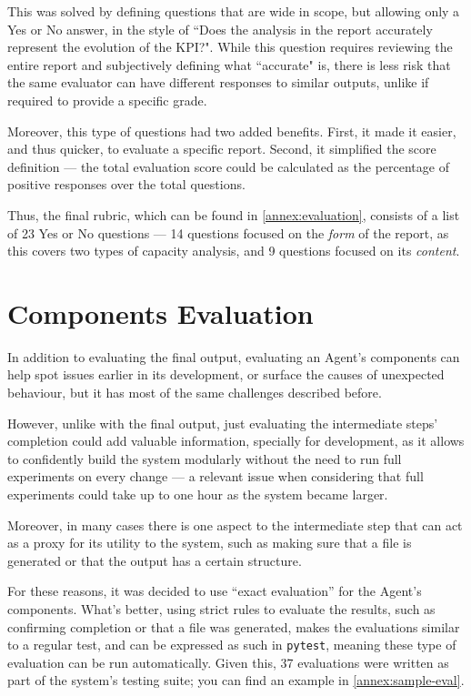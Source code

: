 \documentclass[a4paper]{report}
\begin{document}
This was solved by defining questions that are wide in scope, but allowing only a Yes or No answer, in the style of ``Does the analysis in the report accurately represent the evolution of the KPI?". While this question requires reviewing the entire report and subjectively defining what ``accurate" is, there is less risk that the same evaluator can have different responses to similar outputs, unlike if required to provide a specific grade.

Moreover, this type of questions had two added benefits. First, it made it easier, and thus quicker, to evaluate a specific report. Second, it simplified the score definition --- the total evaluation score could be calculated as the percentage of positive responses over the total questions.

Thus, the final rubric, which can be found in \autoref{annex:evaluation}, consists of a list of 23 Yes or No questions --- 14 questions focused on the \textit{form} of the report, as this covers two types of capacity analysis, and 9 questions focused on its \textit{content}.

\section{Components Evaluation}
\label{sec:components-evals}

In addition to evaluating the final output, evaluating an Agent's components can help spot issues earlier in its development, or surface the causes of unexpected behaviour, but it has most of the same challenges described before.

However, unlike with the final output, just evaluating the intermediate steps' completion could add valuable information, specially for development, as it allows to confidently build the system modularly without the need to run full experiments on every change --- a relevant issue when considering that full experiments could take up to one hour as the system became larger.

Moreover, in many cases there is one aspect to the intermediate step that can act as a proxy for its utility to the system, such as making sure that a file is generated or that the output has a certain structure.

For these reasons, it was decided to use ``exact evaluation'' for the Agent's components. What's better, using strict rules to evaluate the results, such as confirming completion or that a file was generated, makes the evaluations similar to a regular test, and can be expressed as such in \texttt{pytest}, meaning these type of evaluation can be run automatically. Given this, 37 evaluations were written as part of the system's testing suite; you can find an example in \autoref{annex:sample-eval}.
\end{document}
